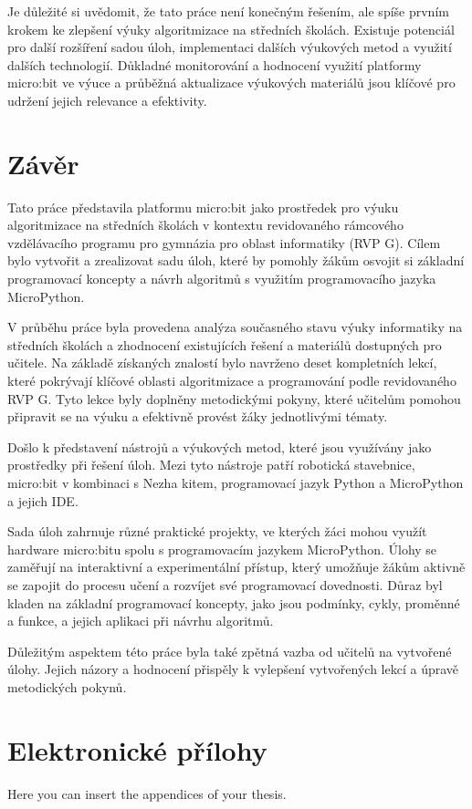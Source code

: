 \documentclass[
  digital,     %
  oneside,     %
  nosansbold,  %
  colorbold, %
  lof,         %
  nolot,         %
]{fithesis4}
\begin{document}
Je důležité si uvědomit, že tato práce není konečným řešením, ale spíše prvním krokem ke zlepšení výuky algoritmizace na středních školách. Existuje potenciál pro další rozšíření sadou úloh, implementaci dalších výukových metod a využití dalších technologií. Důkladné monitorování a hodnocení využití platformy micro:bit ve výuce a průběžná aktualizace výukových materiálů jsou klíčové pro udržení jejich relevance a efektivity.

\chapter{Závěr}
Tato práce představila platformu micro:bit jako prostředek pro výuku algoritmizace na středních školách v kontextu revidovaného rámcového vzdělávacího programu pro gymnázia pro oblast informatiky (RVP G). Cílem bylo vytvořit a zrealizovat sadu úloh, které by pomohly žákům osvojit si základní programovací koncepty a návrh algoritmů s využitím programovacího jazyka MicroPython.

V průběhu práce byla provedena analýza současného stavu výuky informatiky na středních školách a zhodnocení existujících řešení a materiálů dostupných pro učitele. Na základě získaných znalostí bylo navrženo deset kompletních lekcí, které pokrývají klíčové oblasti algoritmizace a programování podle revidovaného RVP G. Tyto lekce byly doplněny metodickými pokyny, které učitelům pomohou připravit se na výuku a efektivně provést žáky jednotlivými tématy.

Došlo k představení nástrojů a výukových metod, které jsou využívány jako prostředky při řešení úloh. Mezi tyto nástroje patří robotická stavebnice, micro:bit v kombinaci s Nezha kitem, programovací jazyk Python a MicroPython a jejich IDE.

Sada úloh zahrnuje různé praktické projekty, ve kterých žáci mohou využít hardware micro:bitu spolu s programovacím jazykem MicroPython. Úlohy se zaměřují na interaktivní a experimentální přístup, který umožňuje žákům aktivně se zapojit do procesu učení a rozvíjet své programovací dovednosti. Důraz byl kladen na základní programovací koncepty, jako jsou podmínky, cykly, proměnné a funkce, a jejich aplikaci při návrhu algoritmů.

Důležitým aspektem této práce byla také zpětná vazba od učitelů na vytvořené úlohy. Jejich názory a hodnocení přispěly k  vylepšení vytvořených lekcí a úpravě metodických pokynů. 

\printbibliography[heading=bibintoc] %

  \makeatletter\thesis@blocks@clear\makeatother
  \printindex

\appendix %
\chapter{Elektronické přílohy}
Here you can insert the appendices of your thesis.
\end{document}
